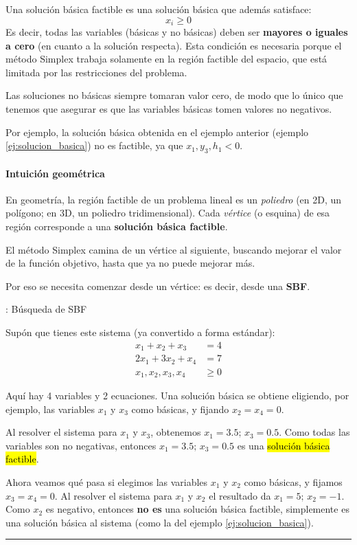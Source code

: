 Una solución básica factible es una solución básica que además satisface:
\[
x_i \geq 0
\]
Es decir, todas las variables (básicas y no básicas) deben ser \textbf{mayores o iguales a cero} (en cuanto a la solución respecta). Esta condición es necesaria porque el método Simplex trabaja solamente en la región factible del espacio, que está limitada por las restricciones del problema.

Las soluciones no básicas siempre tomaran valor cero, de modo que lo único que tenemos que asegurar es que las variables básicas tomen valores no negativos.

Por ejemplo, la solución básica obtenida en el ejemplo anterior (ejemplo \ref{ej:solucion_basica}) no es factible, ya que \(x_1, y_3, h_1 < 0\).

\paragraph{Intuición geométrica}

En geometría, la región factible de un problema lineal es un \textit{poliedro} (en 2D, un polígono; en 3D, un poliedro tridimensional). Cada \textit{vértice} (o esquina) de esa región corresponde a una \textbf{solución básica factible}.

El método Simplex camina de un vértice al siguiente, buscando mejorar el valor de la función objetivo, hasta que ya no puede mejorar más.

Por eso se necesita comenzar desde un vértice: es decir, desde una \textbf{SBF}.

\ejemplo\label{ej:busqueda_sbf}{: Búsqueda de SBF}

Supón que tienes este sistema (ya convertido a forma estándar):
\begin{align*}
  x_1 + x_2 + x_3 &= 4 \\
  2x_1 + 3x_2 + x_4 &= 7 \\
  x_1, x_2, x_3, x_4 &\geq 0
\end{align*}

Aquí hay 4 variables y 2 ecuaciones. Una solución básica se obtiene eligiendo, por ejemplo, las variables \(x_1\) y \(x_3\) como básicas, y fijando \(x_2 = x_4 = 0\).

Al resolver el sistema para \(x_1\) y \(x_3\), obtenemos \(x_1 = 3.5;\, x_3 = 0.5\). Como todas las variables son no negativas, entonces \(x_1 = 3.5;\, x_3 = 0.5\) es una \hl{solución básica factible}.

Ahora veamos qué pasa si elegimos las variables \(x_1\) y \(x_2\) como básicas, y fijamos \(x_3 = x_4 = 0\). Al resolver el sistema para \(x_1\) y \(x_2\) el resultado da \(x_1 = 5;\, x_2 = -1\). Como \(x_2\) es negativo, entonces \textbf{no es} una solución básica factible, simplemente es una solución básica al sistema (como la del ejemplo \ref{ej:solucion_basica}).
\vspace{5mm}
\hrule

